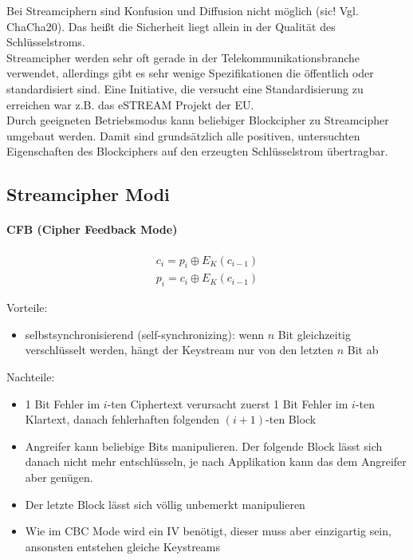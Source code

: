 \noindent Bei Streamciphern sind Konfusion und Diffusion nicht möglich (sic! Vgl. ChaCha20). Das heißt die Sicherheit liegt allein in 
der Qualität des Schlüsselstroms. \\

\noindent Streamcipher werden sehr oft gerade in der Telekommunikationsbranche verwendet,
allerdings gibt es sehr wenige Spezifikationen die öffentlich oder standardisiert sind. Eine Initiative, die versucht eine Standardisierung zu erreichen war z.B. das
eSTREAM Projekt der EU. \\

\noindent Durch geeigneten Betriebsmodus kann beliebiger Blockcipher zu Streamcipher umgebaut werden. Damit sind grundsätzlich alle positiven, untersuchten Eigenschaften des
Blockciphers auf den erzeugten Schlüsselstrom übertragbar.

\subsection{Streamcipher Modi}

\paragraph{CFB (Cipher Feedback Mode)}

\begin{align*}
    c_i = p_i \oplus E_K(c_{i-1}) \\
    p_i = c_i \oplus E_K(c_{i-1})
\end{align*}

Vorteile: 
\begin{itemize}
    \item selbstsynchronisierend (self-synchronizing): wenn $n$ Bit gleichzeitig verschlüsselt werden, hängt der Keystream 
    nur von den letzten $n$ Bit ab
\end{itemize}

Nachteile: 
\begin{itemize}
    \item 1 Bit Fehler im $i$-ten Ciphertext verursacht zuerst 1 Bit Fehler im $i$-ten Klartext, danach
fehlerhaften folgenden $(i+1)$-ten Block
    \item Angreifer kann beliebige Bits manipulieren. Der folgende Block lässt sich danach nicht
mehr entschlüsseln, je nach Applikation kann das dem Angreifer aber genügen. 
    \item Der letzte Block lässt sich völlig unbemerkt manipulieren
    \item Wie im CBC Mode wird ein IV benötigt, dieser muss aber einzigartig sein, ansonsten
entstehen gleiche Keystreams
\end{itemize}


